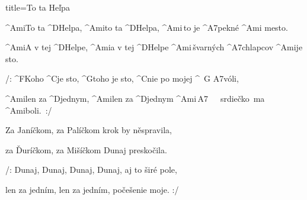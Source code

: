 \begin{song}{title=\predtitle\centering To ta He\v lpa \\\large  \vspace*{-0.3cm}}  %
\begin{centerjustified}
\nejnejvetsi

\sloka 
	^{Ami}To ta ^{D\z}Helpa, ^{Ami}to ta ^{D\z}Helpa, ^{Ami\,}to je ^{A7\z}pekné ^{Ami\,\,}mesto.

	^{Ami}A v tej ^{D\z}Helpe, ^{Ami}a v tej ^{D\z}Helpe ^{Ami\,\z}švarných ^{A7\z}chlapcov ^{Ami}je sto.

	/: ^{F\z}Koho ^{C}je sto, ^{G\z}toho je sto, ^{C}nie po mojej ^{\,\,\,G\,\,A7}vóli,

	^{Ami}len za ^{D\z}jednym, ^{Ami}len za ^{D\z}jednym ^{Ami\,A7{\z}}~~~srdiečko~ma ^{Ami\z}boli.~:/


\sloka
	Za Janíčkom, za Palíčkom krok by něspravila,
	
	za Ďuríčkom, za Mišíčkom Dunaj preskočila.

	/: Dunaj, Dunaj, Dunaj, Dunaj, aj to širé pole,
	
	len za jedním, len za jedním, počešenie moje. :/

\end{centerjustified}
\setcounter{Slokočet}{0}
\end{song}
